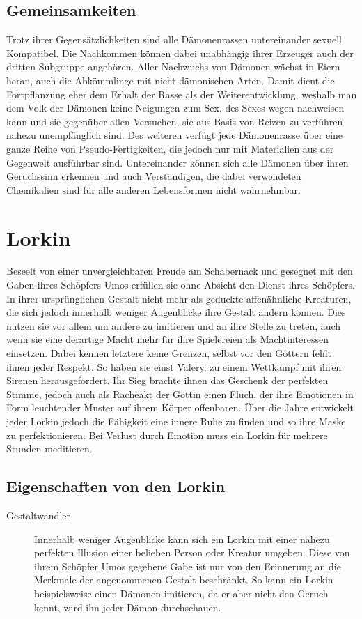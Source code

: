 \documentclass[a4paper,12pt,oneside]{book}
\begin{document}
\begin{description}
\subsection{Gemeinsamkeiten}
Trotz ihrer Gegensätzlichkeiten sind alle Dämonenrassen untereinander sexuell Kompatibel. Die Nachkommen können dabei unabhängig ihrer Erzeuger auch der dritten Subgruppe angehören. Aller Nachwuchs von Dämonen wächst in Eiern heran, auch die Abkömmlinge mit nicht-dämonischen Arten. Damit dient die Fortpflanzung eher dem Erhalt der Rasse als der Weiterentwicklung, weshalb man dem Volk der Dämonen keine Neigungen zum Sex, des Sexes wegen nachweisen kann und sie gegenüber allen Versuchen, sie aus Basis von Reizen zu verführen nahezu unempfänglich sind. Des weiteren verfügt jede Dämonenrasse über eine ganze Reihe von Pseudo-Fertigkeiten, die jedoch nur mit Materialien aus der Gegenwelt ausführbar sind. Untereinander können sich alle Dämonen über ihren Geruchssinn erkennen und auch Verständigen, die dabei verwendeten Chemikalien sind für alle anderen Lebensformen nicht wahrnehmbar. 
 \end{description}  

\section{Lorkin}
Beseelt von einer unvergleichbaren Freude am Schabernack und gesegnet mit den Gaben ihres Schöpfers Umos erfüllen sie ohne Absicht den Dienst ihres Schöpfers. In ihrer ursprünglichen Gestalt nicht mehr als geduckte affenähnliche Kreaturen, die sich jedoch innerhalb weniger Augenblicke ihre Gestalt ändern können. Dies nutzen sie vor allem um andere zu imitieren und an ihre Stelle zu treten, auch wenn sie eine derartige Macht mehr für ihre Spielereien als Machtinteressen einsetzen. Dabei kennen letztere keine Grenzen, selbst vor den Göttern fehlt ihnen jeder Respekt. So haben sie einst Valery, zu einem Wettkampf mit ihren Sirenen herausgefordert. Ihr Sieg brachte ihnen das Geschenk der perfekten Stimme, jedoch auch als Racheakt der Göttin einen Fluch, der ihre Emotionen in Form leuchtender Muster auf ihrem Körper offenbaren. Über die Jahre entwickelt jeder Lorkin jedoch die Fähigkeit eine innere Ruhe zu finden und so ihre Maske zu perfektionieren. Bei Verlust durch Emotion muss ein Lorkin für mehrere Stunden meditieren.
\subsection{Eigenschaften von den Lorkin}
\begin{description}
\item[Gestaltwandler]Innerhalb weniger Augenblicke kann sich ein Lorkin mit einer nahezu perfekten Illusion einer belieben Person oder Kreatur umgeben. Diese von ihrem Schöpfer Umos gegebene Gabe ist nur von den Erinnerung an die Merkmale der angenommenen Gestalt beschränkt. So kann ein Lorkin beispielsweise einen Dämonen imitieren, da er aber nicht den Geruch kennt, wird ihn jeder Dämon durchschauen. 
\end{description}
\end{document}
